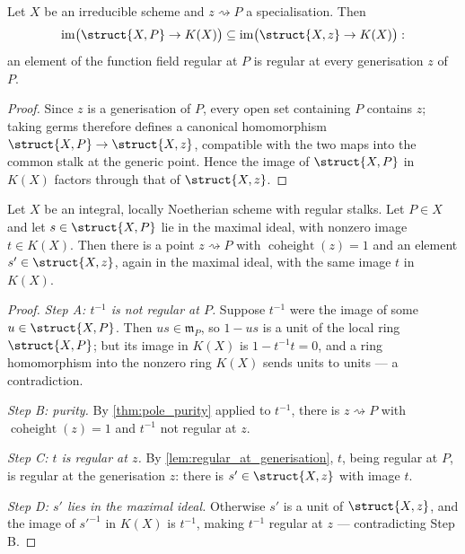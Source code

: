 \begin{lemma}
  \label{lem:regular_at_generisation}
  \leanok
  Let \(X\) be an irreducible scheme and \(z \rightsquigarrow P\) a
  specialisation. Then
  \[
    \operatorname{im}\bigl(\struct{X,P} \to K(X)\bigr)
    \subseteq
    \operatorname{im}\bigl(\struct{X,z} \to K(X)\bigr):
  \]
  an element of the function field regular at \(P\) is regular at every
  generisation \(z\) of \(P\).
\end{lemma}
\begin{proof}
  \leanok
  Since \(z\) is a generisation of \(P\), every open set containing \(P\)
  contains \(z\); taking germs therefore defines a canonical homomorphism
  \(\struct{X,P} \to \struct{X,z}\), compatible with the two maps into the
  common stalk at the generic point. Hence the image of \(\struct{X,P}\) in
  \(K(X)\) factors through that of \(\struct{X,z}\).
\end{proof}

\begin{theorem}
  \label{thm:zero_locus_pure_codim_one}
  \leanok
  Let \(X\) be an integral, locally Noetherian scheme with regular stalks. Let
  \(P \in X\) and let \(s \in \struct{X,P}\) lie in the maximal ideal, with
  nonzero image \(t \in K(X)\). Then there is a point \(z \rightsquigarrow P\)
  with \(\operatorname{coheight}(z) = 1\) and an element
  \(s' \in \struct{X,z}\), again in the maximal ideal, with the same image
  \(t\) in \(K(X)\).
\end{theorem}
\begin{proof}
  \leanok
  \emph{Step A: \(t^{-1}\) is not regular at \(P\).} Suppose
  \(t^{-1}\) were the image of some \(u \in \struct{X,P}\). Then \(u s \in
  \mathfrak m_P\), so \(1 - u s\) is a unit of the local ring
  \(\struct{X,P}\); but its image in \(K(X)\) is
  \(1 - t^{-1} t = 0\), and a ring homomorphism into the nonzero ring \(K(X)\)
  sends units to units --- a contradiction.

  \emph{Step B: purity.} By \ref{thm:pole_purity} applied to \(t^{-1}\), there
  is \(z \rightsquigarrow P\) with \(\operatorname{coheight}(z) = 1\) and
  \(t^{-1}\) not regular at \(z\).

  \emph{Step C: \(t\) is regular at \(z\).} By
  \ref{lem:regular_at_generisation}, \(t\), being regular at \(P\), is regular
  at the generisation \(z\): there is \(s' \in \struct{X,z}\) with image
  \(t\).

  \emph{Step D: \(s'\) lies in the maximal ideal.} Otherwise \(s'\) is a unit
  of \(\struct{X,z}\), and the image of \(s'^{-1}\) in \(K(X)\) is
  \(t^{-1}\), making \(t^{-1}\) regular at \(z\) --- contradicting Step B.
\end{proof}

